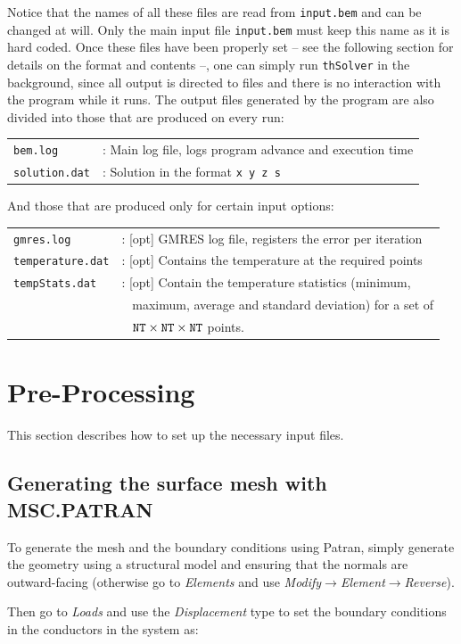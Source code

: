 \documentclass[12pt]{article}
\begin{document}
Notice that the names of all these files are read from \verb+input.bem+ and can be changed at will. Only the main input file \verb+input.bem+ must keep this name as it is hard coded. Once these files have been properly set -- see the following section for details on the format and contents --, one can simply run \verb+thSolver+ in the background, since all output is directed to files and there is no interaction with the program while it runs. The output files generated by the program are also divided into those that are produced on every run:

\begin{tabular}{ll}
\texttt{bem.log}&: Main log file, logs program advance and execution time\\
\texttt{solution.dat}&: Solution in the format \texttt{x y z s}
\end{tabular}

And those that are produced only for certain input options:

\begin{tabular}{ll}
\texttt{gmres.log}&: [opt] GMRES log file, registers the error per iteration\\
\texttt{temperature.dat}&: [opt] Contains the temperature at the required points\\
\texttt{tempStats.dat}&: [opt] Contain the temperature statistics (minimum, \\
  & \verb+ + maximum, average and standard deviation) for a set of \\
  & \verb+ + ${\tt NT}\times{\tt NT}\times{\tt NT}$ points.
\end{tabular}

\section{Pre-Processing}
This section describes how to set up the necessary input files.

\subsection{Generating the surface mesh with MSC.PATRAN}
To generate the mesh and the boundary conditions using Patran, simply generate the geometry using a structural model and ensuring that the normals are outward-facing (otherwise go to {\it Elements} and use {\it Modify$\rightarrow$Element$\rightarrow$Reverse}).

Then go to {\it Loads} and use the {\it Displacement} type to set the boundary conditions in the conductors in the system as:
\end{document}

